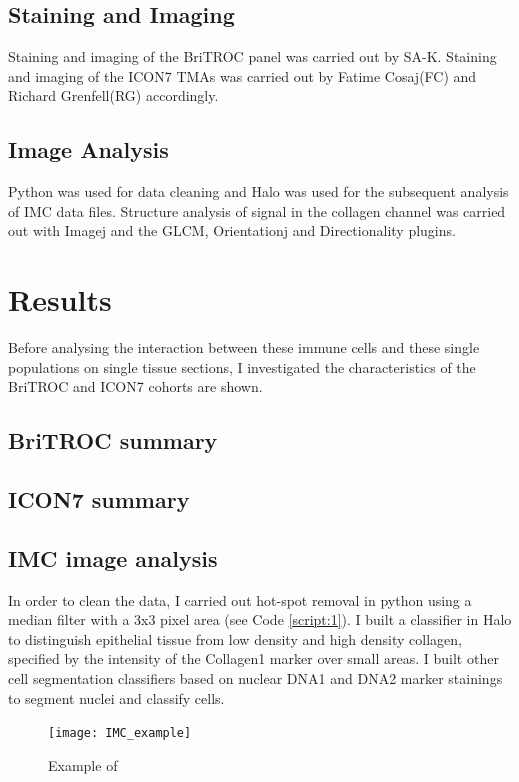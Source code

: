 \subsection{Staining and Imaging}
Staining and imaging of the BriTROC panel was carried out by SA-K. Staining and imaging of the ICON7 TMAs was carried out by Fatime Cosaj(FC) and Richard Grenfell(RG) accordingly.

\subsection{Image Analysis}
Python was used for data cleaning and Halo was used for the subsequent analysis of IMC data files. Structure analysis of signal in the collagen channel was carried out with Imagej and the GLCM, Orientationj and Directionality plugins. 


\section{Results}
Before analysing the interaction between these immune cells and these single populations on single tissue sections, I investigated the characteristics of the BriTROC and ICON7 cohorts are shown.

\subsection{BriTROC summary}
\subsection{ICON7 summary}

\subsection{IMC image analysis}
 In order to clean the data, I carried out hot-spot removal in python using a median filter with a 3x3 pixel area (see Code \ref{script:1}).
 I built a classifier in Halo to distinguish epithelial tissue from low density and high density collagen, specified by the intensity of the Collagen1 marker over small areas.
 I built other cell segmentation classifiers based on nuclear DNA1 and DNA2 marker stainings to segment nuclei and classify cells. 
 
 \begin{figure}
     \centering
     \texttt{[image: IMC\_example]}
     \caption{Example of }
     \label{fig:IMC_example}
 \end{figure}

